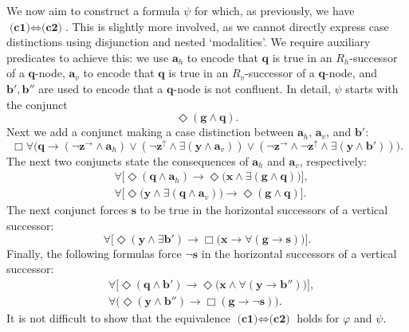 \documentclass[10pt,a4paper]{amsart}
\theoremstyle{plain}
\theoremstyle{definition}
\newcommand{\avec}[1]{\boldsymbol{#1}}
\newcommand{\q}{{\avec{q}}}
\newcommand{\bbvarup}{\Zvar^\uparrow}
\newcommand{\bbvarright}{\Zvar^\to}
\newcommand{\ssvar}{\fform{s}}
\newcommand{\fform}[1]{\boldsymbol{#1}}
\newcommand{\qvar}{\fform{q}}
\newcommand{\avar}{\fform{a}}
\newcommand{\gvar}{\fform{g}}
\newcommand{\bvar}{\fform{b}}
\newcommand{\xvar}{\fform{x}}
\newcommand{\yvar}{\fform{y}}
\newcommand{\Zvar}{\fform{z}}
\newcommand{\Bv}{\forall}
\newcommand{\Bh}{\Box}
\newcommand{\Dv}{\exists}
\newcommand{\Dh}{\Diamond}
\begin{document}
	We now aim to construct a formula $\psi$ for which, as previously, 
	we have $\textbf{(c1)} \Leftrightarrow \textbf{(c2)}$.
	This is slightly more involved, as we cannot directly express case distinctions using disjunction and nested `modalities'.
	We require auxiliary predicates to achieve this:
	we use $\avar_{h}$ to encode that $\qvar$ is true in an $R_{h}$-successor of a $\qvar$-node,
	$\avar_{v}$ to encode that $\qvar$ is true in an $R_{v}$-successor of a $\qvar$-node,
	and $\bvar',\bvar''$ are used to encode that a $\qvar$-node is not confluent. In detail, $\psi$ starts with the conjunct
	$$
	\Diamond (\gvar \wedge \qvar).
	$$
	Next we add a conjunct making a case distinction between $\avar_{h}$, $\avar_{v}$, and $\bvar'$:
	$$
	\Bh\Bv\bigl(\qvar\to
	(\neg\bbvarright\land\avar_h)\lor
	(\neg\bbvarup\land\Dv(\yvar\land\avar_v)) 
	\lor(\neg\bbvarright\land\neg\bbvarup\land\Dv(\yvar\land\bvar'))
	\bigr).
	$$
	The next two conjuncts state the consequences of $\avar_{h}$ and $\avar_{v}$, respectively:
	\begin{align*}
		& \Bv\bigl[\Dh(\qvar \wedge \avar_{h}) \rightarrow \Dh\bigl(\xvar \wedge \Dv (\gvar \wedge \qvar)\bigr)\bigr], \\
		&
		\Bv\bigl[ \Dh \bigl(\yvar \wedge\Dv(\qvar\land\avar_{v})\bigr) \rightarrow \Dh (\gvar \wedge \qvar)\bigr].
	\end{align*}
	The next conjunct forces $\ssvar$ to be true in the horizontal successors of a vertical successor:
	$$
	\Bv \bigl[\Dh (\yvar \wedge \Dv\bvar' )\rightarrow \Bh \bigl(\xvar \rightarrow \Bv (\gvar \rightarrow \ssvar)\bigr)\bigr].
	$$ 
	Finally, the following formulas force $\neg\ssvar$ in the horizontal successors of a vertical successor:
	\begin{align*}
		&\Bv \bigl[\Dh (\qvar \wedge \bvar')\rightarrow \Dh \bigl(\xvar \wedge \Bv (\yvar \rightarrow \bvar'')\bigr)\bigr],\\
		&
		\Bv\bigl(\Dh (\yvar \wedge \bvar'') \rightarrow \Bh (\gvar \rightarrow \neg \ssvar)\bigr).
	\end{align*} 
	It is not difficult to show that the equivalence $\textbf{(c1)} \Leftrightarrow \textbf{(c2)}$ holds
	for $\varphi$ and $\psi$.
	
\end{document}

